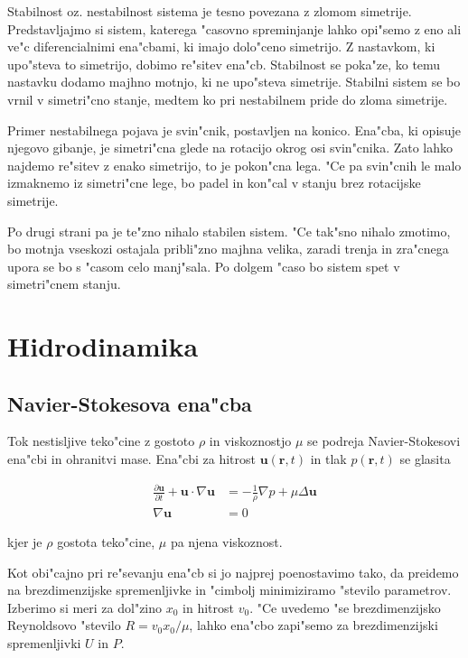 \documentclass[a4paper,10pt]{article}
\renewcommand{\vec}{\mathbf}
\newcommand{\rt}{(\vec r, t)}
\begin{document}
Stabilnost oz. nestabilnost sistema je tesno povezana z zlomom simetrije. Predstavljajmo si sistem, katerega "casovno spreminjanje lahko opi"semo z eno ali ve"c diferencialnimi ena"cbami, ki imajo dolo"ceno simetrijo. Z nastavkom, ki upo"steva to simetrijo, dobimo re"sitev ena"cb. Stabilnost se poka"ze, ko temu nastavku dodamo majhno motnjo, ki ne upo"steva simetrije. Stabilni sistem se bo vrnil v simetri"cno stanje, medtem ko pri nestabilnem pride do zloma simetrije. 

Primer nestabilnega pojava je svin"cnik, postavljen na konico. Ena"cba, ki opisuje njegovo gibanje, je simetri"cna glede na rotacijo okrog osi svin"cnika. Zato lahko najdemo re"sitev z enako simetrijo, to je pokon"cna lega. "Ce pa svin"cnih le malo izmaknemo iz simetri"cne lege, bo padel in kon"cal v stanju brez rotacijske simetrije. 

Po drugi strani pa je te"zno nihalo stabilen sistem. "Ce tak"sno nihalo zmotimo, bo motnja vseskozi ostajala pribli"zno majhna velika, zaradi trenja in zra"cnega upora se bo s "casom celo manj"sala. Po dolgem "caso bo sistem spet v simetri"cnem stanju. 


\section{Hidrodinamika}

\subsection{Navier-Stokesova ena"cba}

Tok nestisljive teko"cine z gostoto $\rho$ in viskoznostjo $\mu$ se podreja Navier-Stokesovi ena"cbi in ohranitvi mase. Ena"cbi za hitrost $\vec u\rt$ in tlak $p\rt$ se glasita

\begin{align}
 \label{eq:ns-enacba}
\frac{\partial \vec u}{\partial t} + \vec u \cdot \nabla \vec u &= -\frac{1}{\rho}\nabla p + \mu \Delta \vec u \\
\nabla \vec u &= 0
\end{align}

kjer je $\rho$ gostota teko"cine, $\mu$ pa njena viskoznost. 

Kot obi"cajno pri re"sevanju ena"cb si jo najprej poenostavimo tako, da preidemo na brezdimenzijske spremenljivke in "cimbolj minimiziramo "stevilo parametrov. Izberimo si meri za dol"zino $x_0$ in hitrost $v_0$. "Ce uvedemo "se brezdimenzijsko Reynoldsovo "stevilo $R=v_0 x_0 / \mu$, lahko ena"cbo zapi"semo za brezdimenzijski spremenljivki $U$ in $P$. 
\end{document}
